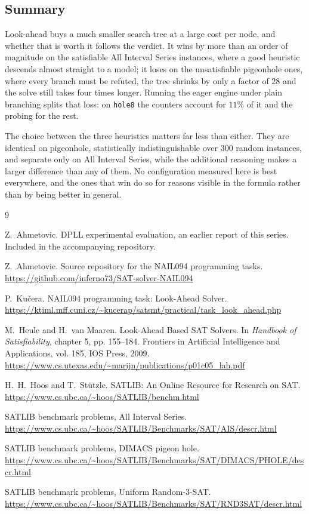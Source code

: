 \documentclass[11pt,a4paper]{article}
\begin{document}
\subsection*{Summary}

Look-ahead buys a much smaller search tree at a large cost per node, and
whether that is worth it follows the verdict. It wins by more than an order of
magnitude on the satisfiable All Interval Series instances, where a good
heuristic descends almost straight to a model; it loses on the unsatisfiable
pigeonhole ones, where every branch must be refuted, the tree shrinks by only a
factor of $28$ and the solve still takes four times longer. Running the eager
engine under plain branching splits that loss: on \texttt{hole8} the counters
account for $11\%$ of it and the probing for the rest.

The choice between the three heuristics matters far less than either. They are
identical on pigeonhole, statistically indistinguishable over $300$ random
instances, and separate only on All Interval Series, while the additional
reasoning makes a larger difference than any of them. No configuration measured
here is best everywhere, and the ones that win do so for reasons visible in the
formula rather than by being better in general.

\begin{thebibliography}{9}

Z.~Ahmetovic.
\newblock DPLL experimental evaluation, an earlier report of this series.
\newblock Included in the accompanying repository.

Z.~Ahmetovic.
\newblock Source repository for the NAIL094 programming tasks.
\newblock \url{https://github.com/inferno73/SAT-solver-NAIL094}

P.~Ku\v{c}era.
\newblock NAIL094 programming task: Look-Ahead Solver.
\newblock \url{https://ktiml.mff.cuni.cz/~kucerap/satsmt/practical/task_look_ahead.php}

M.~Heule and H.~van Maaren.
\newblock Look-Ahead Based SAT Solvers.
\newblock In \emph{Handbook of Satisfiability}, chapter 5, pp. 155--184.
\newblock Frontiers in Artificial Intelligence and Applications, vol. 185,
IOS Press, 2009.
\newblock \url{https://www.cs.utexas.edu/~marijn/publications/p01c05_lah.pdf}

H.~H.~Hoos and T.~St\"utzle.
\newblock SATLIB: An Online Resource for Research on SAT.
\newblock \url{https://www.cs.ubc.ca/~hoos/SATLIB/benchm.html}

SATLIB benchmark problems, All Interval Series.
\newblock \url{https://www.cs.ubc.ca/~hoos/SATLIB/Benchmarks/SAT/AIS/descr.html}

SATLIB benchmark problems, DIMACS pigeon hole.
\newblock \url{https://www.cs.ubc.ca/~hoos/SATLIB/Benchmarks/SAT/DIMACS/PHOLE/descr.html}

SATLIB benchmark problems, Uniform Random-3-SAT.
\newblock \url{https://www.cs.ubc.ca/~hoos/SATLIB/Benchmarks/SAT/RND3SAT/descr.html}

\end{thebibliography}
\end{document}
